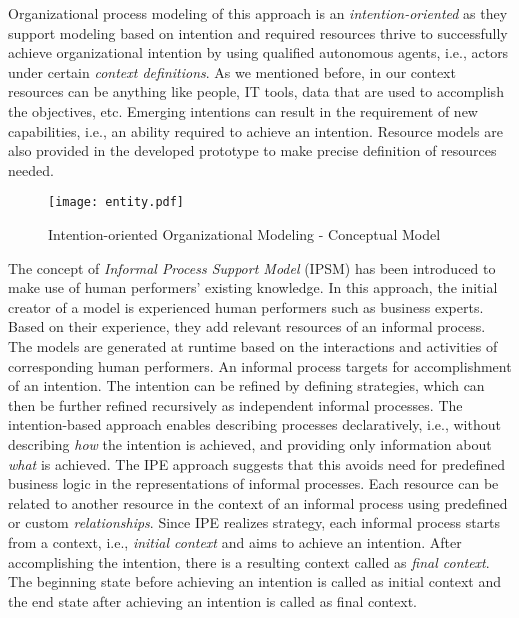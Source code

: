 Organizational process modeling of this approach is an \textit{intention-oriented} as they support modeling based on intention and required resources thrive to successfully achieve organizational intention by using qualified autonomous agents, i.e., actors under certain \textit{context definitions}. As we mentioned before, in our context resources can be anything like people, IT tools, data that are used to accomplish the objectives, etc. Emerging intentions can result in the requirement of new capabilities, i.e., an ability required to achieve an intention. Resource models are also provided in the developed prototype to make precise definition of resources needed.

\begin{figure}
	\centering
	\texttt{[image: entity.pdf]}
	\caption{Intention-oriented Organizational Modeling - Conceptual Model}
	\label{fig:entitymodel}
\end{figure}

The concept of \textit{Informal Process Support Model} (IPSM) \cite{Sungur2014a} has been introduced to make use of human performers' existing knowledge. In this approach, the initial creator of a model is experienced human performers such as business experts. Based on their experience, they add relevant resources of an informal process. The models are generated at runtime based on the interactions and activities of corresponding human performers. An informal process targets for accomplishment of an intention. The intention can be refined by defining strategies, which can then be further refined recursively as independent informal processes. The intention-based approach enables describing processes declaratively, i.e., without describing \textit{how} the intention is achieved, and providing only information about \textit{what} is achieved. The IPE approach \cite{Sungur2014a} suggests that this avoids need for predefined business logic in the representations of informal processes. Each resource can be related to another resource in the context of an informal process using predefined or custom \textit{relationships}. Since IPE realizes strategy, each informal process starts from a context, i.e., \textit{initial context} and aims to achieve an intention. After accomplishing the intention, there is a resulting context called as \textit{final context}. The beginning state before achieving an intention is called as initial context and the end state after achieving an intention is called as final context.

